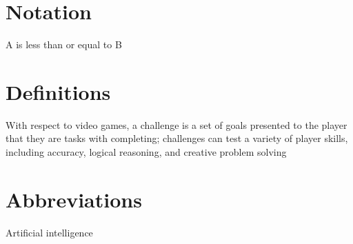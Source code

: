 
\section*{Notation}
\begin{description}[font=\rmfamily\bfseries, leftmargin=3cm, style=nextline]
	\item[$A \leq B$] A is less than or equal to B
\end{description}

\section*{Definitions}
\begin{description}[font=\rmfamily\bfseries, leftmargin=3cm, style=nextline]
	\item[Challenge] With respect to video games, a challenge is a set of goals presented to the player that they are tasks with completing; challenges can test a variety of player skills, including accuracy, logical reasoning, and creative problem solving
\end{description}

\section*{Abbreviations}
\begin{description}[font=\rmfamily\bfseries, leftmargin=3cm, style=nextline]
	\item[AI] Artificial intelligence
\end{description}